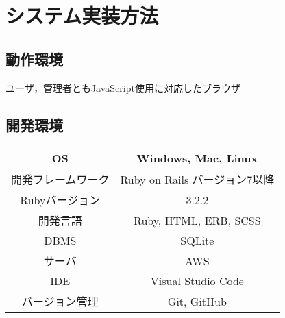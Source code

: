 \chapter{システム実装方法}
\section*{動作環境}
ユーザ，管理者ともJavaScript使用に対応したブラウザ
\section*{開発環境}
\begin{tabular}{|c|c|} \hline
   OS & Windows, Mac, Linux\\  \hline
   開発フレームワーク & Ruby on Rails  バージョン7以降 \\ \hline
   Rubyバージョン & 3.2.2\\  \hline
   開発言語 & Ruby, HTML, ERB, SCSS\\ \hline
   DBMS & SQLite \\ \hline
   サーバ & AWS \\ \hline
   IDE & Visual Studio Code \\ \hline
   バージョン管理 & Git, GitHub \\ \hline
 \end{tabular}
